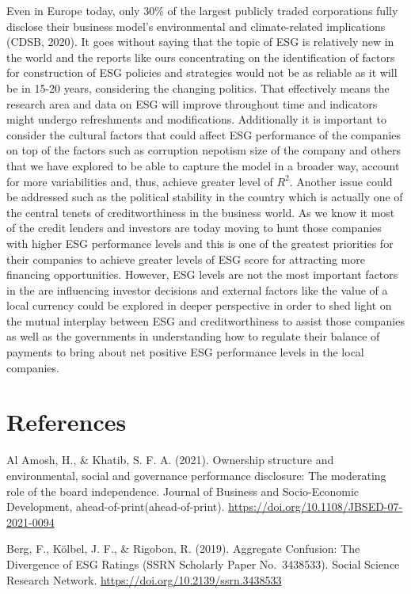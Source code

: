 \documentclass[
  12pt,
]{article}
\begin{document}
Even in Europe today, only 30\% of the largest publicly traded
corporations fully disclose their business model's environmental and
climate-related implications (CDSB, 2020). It goes without saying that
the topic of ESG is relatively new in the world and the reports like
ours concentrating on the identification of factors for construction of
ESG policies and strategies would not be as reliable as it will be in
15-20 years, considering the changing politics. That effectively means
the research area and data on ESG will improve throughout time and
indicators might undergo refreshments and modifications. Additionally it
is important to consider the cultural factors that could affect ESG
performance of the companies on top of the factors such as corruption
nepotism size of the company and others that we have explored to be able
to capture the model in a broader way, account for more variabilities
and, thus, achieve greater level of \(R^2\). Another issue could be
addressed such as the political stability in the country which is
actually one of the central tenets of creditworthiness in the business
world. As we know it most of the credit lenders and investors are today
moving to hunt those companies with higher ESG performance levels and
this is one of the greatest priorities for their companies to achieve
greater levels of ESG score for attracting more financing opportunities.
However, ESG levels are not the most important factors in the are
influencing investor decisions and external factors like the value of a
local currency could be explored in deeper perspective in order to shed
light on the mutual interplay between ESG and creditworthiness to assist
those companies as well as the governments in understanding how to
regulate their balance of payments to bring about net positive ESG
performance levels in the local companies.

\newpage

\hypertarget{references}{%
\section{References}\label{references}}

Al Amosh, H., \& Khatib, S. F. A. (2021). Ownership structure and
environmental, social and governance performance disclosure: The
moderating role of the board independence. Journal of Business and
Socio-Economic Development, ahead-of-print(ahead-of-print).
\url{https://doi.org/10.1108/JBSED-07-2021-0094}

Berg, F., Kölbel, J. F., \& Rigobon, R. (2019). Aggregate Confusion: The
Divergence of ESG Ratings (SSRN Scholarly Paper No.~3438533). Social
Science Research Network. \url{https://doi.org/10.2139/ssrn.3438533}
\end{document}
